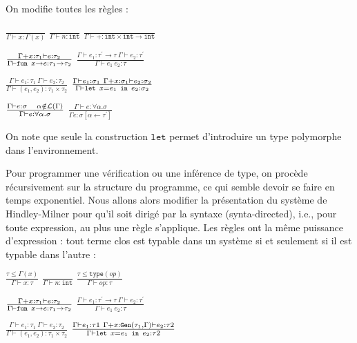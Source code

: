 \documentclass{cours}
\begin{document}
On modifie toutes les règles : 
\begin{center}
    $\frac{}{\Gamma \vdash x : \Gamma(x)}$ 
    $\frac{}{\Gamma \vdash n : \texttt{int}}$
    $\frac{}{\Gamma \vdash + : \texttt{int} \times \texttt{int} \rightarrow \texttt{int}}$
\end{center}
\begin{center}
    $\frac{\Gamma + x : \tau_{1} \vdash e : \tau_{2}}{\Gamma \vdash \texttt{fun } x \rightarrow e:\tau_{1}\rightarrow\tau_{2}}$
    $\frac{\Gamma \vdash e_{1} : \tau^{'}\rightarrow\tau \ \Gamma \vdash e_{2} : \tau^{'}}{\Gamma \vdash e_{1}\ e_{2} : \tau}$
\end{center}
\begin{center}
    $\frac{\Gamma \vdash e_{1} : \tau_{1} \ \Gamma \vdash e_{2} : \tau_{2}}{\Gamma \vdash (e_{1},e_{2}) : \tau_{1} \times \tau_{2}}$
    $\frac{\Gamma \vdash e_{1} : \sigma_{1} \ \Gamma + x : \sigma_{1} \vdash e_{2} : \sigma_{2}}{\Gamma \vdash \letin{x = e_{1}} e_{2} : \sigma_{2}}$
\end{center}
\begin{center}
    $\frac{\Gamma \vdash e : \sigma \ \ \ \alpha \notin \mL(\Gamma)}{\Gamma \vdash e : \forall\alpha.\sigma}$ 
    $\frac{\Gamma \vdash e : \forall\alpha.\sigma}{\Gamma e : \sigma\left[\alpha \leftarrow \tau^{'}\right]}$
\end{center}

On note que seule la construction $\texttt{let}$ permet d'introduire un type polymorphe dans l'environnement. 

Pour programmer une vérification ou une inférence de type, on procède récursivement sur la structure du programme, ce qui semble devoir se faire en temps exponentiel.
Nous allons alors modifier la présentation du système de Hindley-Milner pour qu'il soit dirigé par la syntaxe (synta-directed), i.e., pour toute expression, au plus une règle s'applique. Les règles ont la même puissance d'expression : tout terme clos est typable dans un système si et seulement si il est typable dans l'autre : 

\begin{center}
    $\frac{\tau \leq \Gamma(x)}{\Gamma \vdash x : \tau}$ 
    $\frac{}{\Gamma \vdash n : \texttt{int}}$
    $\frac{\tau \leq \texttt{type}(op)}{\Gamma \vdash op : \tau}$
\end{center}
\begin{center}
    $\frac{\Gamma + x : \tau_{1} \vdash e : \tau_{2}}{\Gamma \vdash \texttt{fun } x \rightarrow e:\tau_{1}\rightarrow\tau_{2}}$
    $\frac{\Gamma \vdash e_{1} : \tau^{'}\rightarrow\tau \ \Gamma \vdash e_{2} : \tau^{'}}{\Gamma \vdash e_{1}\ e_{2} : \tau}$
\end{center}
\begin{center}
    $\frac{\Gamma \vdash e_{1} : \tau_{1} \ \Gamma \vdash e_{2} : \tau_{2}}{\Gamma \vdash (e_{1},e_{2}) : \tau_{1} \times \tau_{2}}$
    $\frac{\Gamma \vdash e_{1} : \tau{1} \ \Gamma + x : \texttt{Gen}(\tau_{1},  \Gamma) \vdash e_{2} : \tau{2}}{\Gamma \vdash \texttt{let } x = e_{1} \texttt{ in } e_{2} : \tau{2}}$
\end{center}
\end{document}
